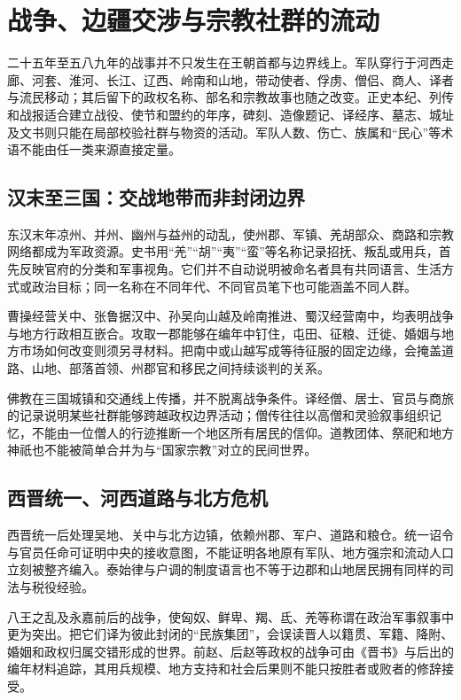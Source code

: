 \section{战争、边疆交涉与宗教社群的流动}
\label{sec:ns-war-frontiers-diplomacy-religion}

二十五年至五八九年的战事并不只发生在王朝首都与边界线上。军队穿行于河西走廊、河套、淮河、长江、辽西、岭南和山地，带动使者、俘虏、僧侣、商人、译者与流民移动；其后留下的政权名称、部名和宗教故事也随之改变。正史本纪、列传和战报适合建立战役、使节和盟约的年序，碑刻、造像题记、译经序、墓志、城址及文书则只能在局部校验社群与物资的活动。军队人数、伤亡、族属和“民心”等术语不能由任一类来源直接定量。

\subsection{汉末至三国：交战地带而非封闭边界}

东汉末年凉州、并州、幽州与益州的动乱，使州郡、军镇、羌胡部众、商路和宗教网络都成为军政资源。史书用“羌”“胡”“夷”“蛮”等名称记录招抚、叛乱或用兵，首先反映官府的分类和军事视角。它们并不自动说明被命名者具有共同语言、生活方式或政治目标；同一名称在不同年代、不同官员笔下也可能涵盖不同人群。

曹操经营关中、张鲁据汉中、孙吴向山越及岭南推进、蜀汉经营南中，均表明战争与地方行政相互嵌合。攻取一郡能够在编年中钉住，屯田、征粮、迁徙、婚姻与地方市场如何改变则须另寻材料。把南中或山越写成等待征服的固定边缘，会掩盖道路、山地、部落首领、州郡官和移民之间持续谈判的关系。

佛教在三国城镇和交通线上传播，并不脱离战争条件。译经僧、居士、官员与商旅的记录说明某些社群能够跨越政权边界活动；僧传往往以高僧和灵验叙事组织记忆，不能由一位僧人的行迹推断一个地区所有居民的信仰。道教团体、祭祀和地方神祇也不能被简单合并为与“国家宗教”对立的民间世界。

\subsection{西晋统一、河西道路与北方危机}

西晋统一后处理吴地、关中与北方边镇，依赖州郡、军户、道路和粮仓。统一诏令与官员任命可证明中央的接收意图，不能证明各地原有军队、地方强宗和流动人口立刻被整齐编入。泰始律与户调的制度语言也不等于边郡和山地居民拥有同样的司法与税役经验。

八王之乱及永嘉前后的战争，使匈奴、鲜卑、羯、氐、羌等称谓在政治军事叙事中更为突出。把它们译为彼此封闭的“民族集团”，会误读晋人以籍贯、军籍、降附、婚姻和政权归属交错形成的世界。前赵、后赵等政权的战争可由《晋书》与后出的编年材料追踪，其用兵规模、地方支持和社会后果则不能只按胜者或败者的修辞接受。

